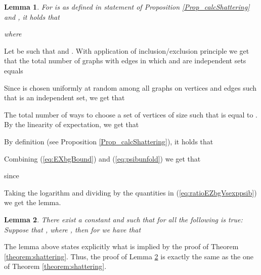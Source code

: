 \documentclass[a4paper,10pt]{article}
\makeatletter
\newcommand{\remove}[1]{}
\newtheorem{lemma}{Lemma}\renewcommand{\thelemma}{\arabic{lemma}}
\newenvironment{proof}{\noindent{\bf Proof\@:}}{\hfill \\}
\makeatother
\begin{document}
\begin{lemma}\label{lemma:PsiXiExpctation}
For  is as defined in statement of Proposition \ref{Prop_calcShattering}
and , it holds that 
 
where 

 
\end{lemma}
\begin{proof}
Let  be such that  and .
With application of inclusion/exclusion principle we get that the total number of graphs
with  edges in which  and  are independent sets equals

Since  is chosen uniformly at random among all 
graphs on  vertices and  edges such that  is an independent set, we get that

The total number of ways to choose a set of vertices  of 
size  such that  is 
equal to . 
By the linearity of expectation, we get that

By definition (see  Proposition \ref{Prop_calcShattering}), 
it holds that 

Combining (\ref{eq:EXbgBound}) and (\ref{eq:psibunfold}) we get that

since 


\noindent
Taking the logarithm and dividing by  the quantities in 
(\ref{eq:ratioEZbgVsexppsib}) we get the lemma.
\end{proof}


\begin{lemma}\label{lemma:SameAsShaterringThrm}
There exist a constant  and  such that for
all  the following is true:
Suppose that , where ,
then for   we have that

\end{lemma}
The lemma above states explicitly what is implied by the proof of 
Theorem \ref{theorem:shattering}. Thus, the proof of Lemma  \ref{lemma:SameAsShaterringThrm} 
is exactly the same as the one of Theorem \ref{theorem:shattering}.

\remove{
\begin{proof}
Let . Assume that  for some
. Consider the functions  
and  as defined in the statement of Lemma
\ref{lemma:PsiXiExpctation}. 
Working as in the proof of Theorem \ref{theorem:shattering} (i.e. (\ref{eqpftheorem:shattering1}))
we get that

  Furthermore, for  
we get that 

From (\ref{eq:psi(c)bound}), for any  we get that

since  for every .
By comparison, for  we have
	
From  (\ref{eq:InverseExpctLbound}) and (\ref{eq:psi(beta)UBound}),
it is direct that (\ref{eq:PsiSupBound}) holds.
\end{proof}
}
\end{document}
